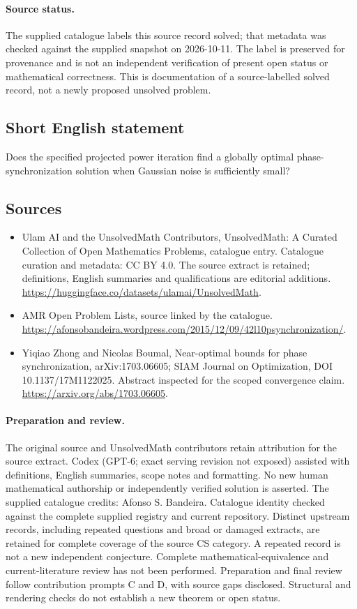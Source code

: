 \documentclass[11pt]{article}
\begin{document}
\paragraph{Source status.}
The supplied catalogue labels this source record solved; that metadata was checked against the supplied snapshot on 2026-10-11. The label is preserved for provenance and is not an independent verification of present open status or mathematical correctness. This is documentation of a source-labelled solved record, not a newly proposed unsolved problem.
\subsection{Short English statement}
Does the specified projected power iteration find a globally optimal phase-synchronization solution when Gaussian noise is sufficiently small?
\subsection{Sources}
\begin{itemize}
\item[\hypertarget{source:statement:1}{S1}] Ulam AI and the UnsolvedMath Contributors, UnsolvedMath: A Curated Collection of Open Mathematics Problems, catalogue entry. Catalogue curation and metadata: CC BY 4.0. The source extract is retained; definitions, English summaries and qualifications are editorial additions.
\url{https://huggingface.co/datasets/ulamai/UnsolvedMath}.
\item[\hypertarget{source:statement:2}{S2}] AMR Open Problem Lists, source linked by the catalogue.
\url{https://afonsobandeira.wordpress.com/2015/12/09/42l10psynchronization/}.
\item[\hypertarget{source:statement:3}{S3}] Yiqiao Zhong and Nicolas Boumal, Near-optimal bounds for phase synchronization, arXiv:1703.06605; SIAM Journal on Optimization, DOI 10.1137/17M1122025. Abstract inspected for the scoped convergence claim.
\url{https://arxiv.org/abs/1703.06605}.
\end{itemize}
\paragraph{Preparation and review.}
The original source and UnsolvedMath contributors retain attribution for the source extract. Codex (GPT-6; exact serving revision not exposed) assisted with definitions, English summaries, scope notes and formatting. No new human mathematical authorship or independently verified solution is asserted. The supplied catalogue credits: Afonso S. Bandeira. Catalogue identity checked against the complete supplied registry and current repository. Distinct upstream records, including repeated questions and broad or damaged extracts, are retained for complete coverage of the source CS category. A repeated record is not a new independent conjecture. Complete mathematical-equivalence and current-literature review has not been performed. Preparation and final review follow contribution prompts C and D, with source gaps disclosed. Structural and rendering checks do not establish a new theorem or open status.
\label{end:statement}
\end{document}

